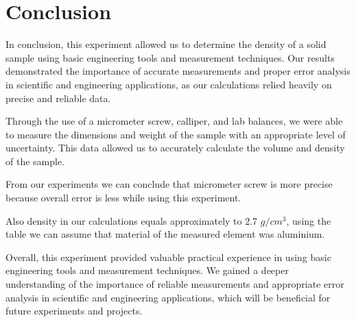 \section{Conclusion}

In conclusion, this experiment allowed us to determine the density of a solid sample using basic engineering tools and measurement techniques. Our results demonstrated the importance of accurate measurements and proper error analysis in scientific and engineering applications, as our calculations relied heavily on precise and reliable data. 

Through the use of a micrometer screw, calliper, and lab balances, we were able to measure the dimensions and weight of the sample with an appropriate level of uncertainty. This data allowed us to accurately calculate the volume and density of the sample. 

From our experiments we can conclude that micrometer screw is more precise because overall error is less while using this experiment.

Also density in our calculations equals approximately to 2.7 $g/cm^3$, using the table we can assume that material of the measured element was aluminium. 

Overall, this experiment provided valuable practical experience in using basic engineering tools and measurement techniques. We gained a deeper understanding of the importance of reliable measurements and appropriate error analysis in scientific and engineering applications, which will be beneficial for future experiments and projects. 